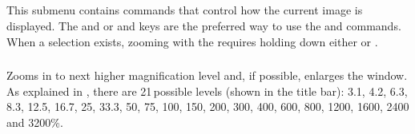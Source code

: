 

\subsection{\protect{}\label{sub:Zoom}}

This submenu contains commands that control how the current image
is displayed. The \mykeystroke{$+$} and \mykeystroke{$-$} or \mykeystroke{$\uparrow$}
and \mykeystroke{$\downarrow$} keys are the preferred way to use
the  and  commands.
When a selection exists, zooming with the  requires
holding down either  or .


\subsubsection[{\protect\userinterface{In {[}+{]}}}]{\protect{}\label{sub:ZoomIn}\improvement{}}

Zooms in to next higher magnification level and, if possible, enlarges
the window. As explained in , there
are 21\,possible levels (shown in the title bar): 3.1, 4.2, 6.3,
8.3, 12.5, 16.7, 25, 33.3, 50, 75, 100, 150, 200, 300, 400, 600, 800,
1200, 1600, 2400 and 3200\%.

